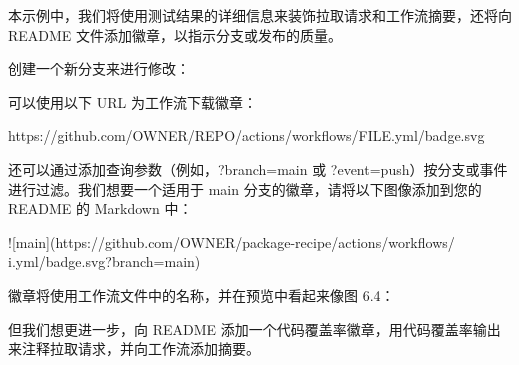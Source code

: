 
本示例中，我们将使用测试结果的详细信息来装饰拉取请求和工作流摘要，还将向 README 文件添加徽章，以指示分支或发布的质量。


创建一个新分支来进行修改：



可以使用以下 URL 为工作流下载徽章：

\begin{shell}
https://github.com/OWNER/REPO/actions/workflows/FILE.yml/badge.svg
\end{shell}

还可以通过添加查询参数（例如，?branch=main 或 ?event=push）按分支或事件进行过滤。我们想要一个适用于 main 分支的徽章，请将以下图像添加到您的 README 的 Markdown 中：

\begin{shell}
![main](https://github.com/OWNER/package-recipe/actions/workflows/ i.yml/badge.svg?branch=main)
\end{shell}

徽章将使用工作流文件中的名称，并在预览中看起来像图 6.4：


但我们想更进一步，向 README 添加一个代码覆盖率徽章，用代码覆盖率输出来注释拉取请求，并向工作流添加摘要。

